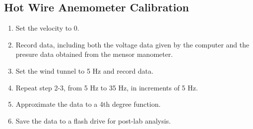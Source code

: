 \subsection{Hot Wire Anemometer Calibration}

\begin{enumerate}
    \item Set the velocity to 0. \item Record data, including both the voltage data given by the computer and the presure data obtained from the mensor manometer.
    \item Set the wind tunnel to 5 Hz and record data. 
    \item Repeat step 2-3, from 5 Hz to 35 Hz, in increments of 5 Hz. 
    \item Approximate the data to a 4th degree function. 
    \item Save the data to a flash drive for post-lab analysis.
\end{enumerate}

